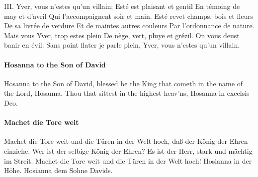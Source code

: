 \documentclass[11pt, ngermanm, titlepage]{article}
\begin{document}
\begin{multicols}{2}
	III. Yver, vous n'estes qu'un villain;\newline
	Esté est plaisant et gentil\newline
	En témoing de may et d'avril\newline
	Qui l'accompaignent soir et main.\newline
	Esté revet champs, bois et fleurs\newline
	De sa livrée de verdure\newline
	Et de maintes autres couleurs\newline
	Par l'ordonnance de nature.\newline
	Mais vous Yver, trop estes plein\newline
	De nège, vert, pluye et grézil.\newline
	On vous deust banir en évil.\newline
	Sans point flater je parle plein,\newline
	Yver, vous n'estes qu'un villain.\newline
	
	\paragraph{Hosanna to the Son of David\newline}
	Hosanna to the Son of David,\newline
	blessed be the King that cometh\newline
	in the name of the Lord, Hosanna.\newline
	Thou that sittest in the highest heav’ns,\newline
	Hosanna in excelsis Deo.
	
	\paragraph{Machet die Tore weit\newline}
	Machet die Tore weit\newline
	und die Türen in der Welt hoch,\newline
	daß der König der Ehren einziehe.\newline
	Wer ist der selbige König der Ehren?\newline
	Es ist der Herr,\newline
	stark und mächtig im Streit.\newline
	Machet die Tore weit\newline
	und die Türen in der Welt hoch!\newline
	Hosianna in der Höhe.\newline
	Hosianna dem Sohne Davids.
	

\end{multicols}
\end{document}

